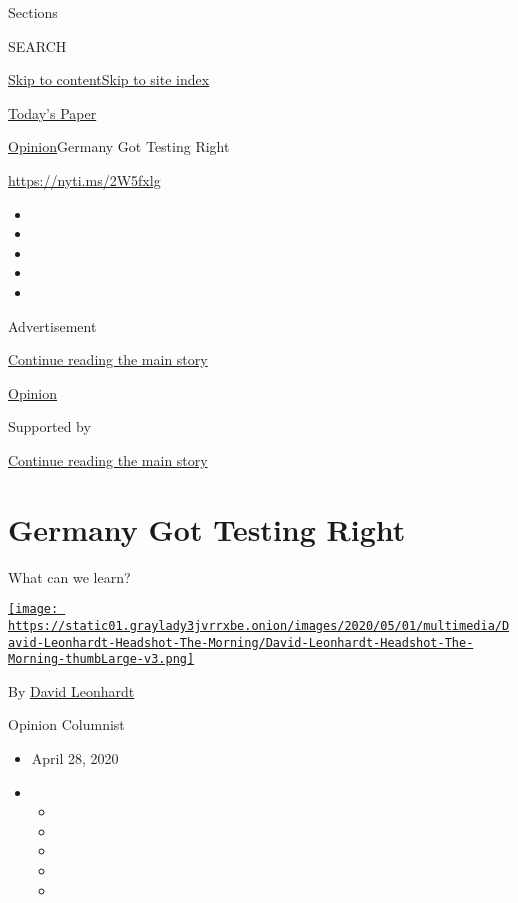 Sections

SEARCH

\protect\hyperlink{site-content}{Skip to
content}\protect\hyperlink{site-index}{Skip to site index}

\href{https://myaccount.nytimes3xbfgragh.onion/auth/login?response_type=cookie\&client_id=vi}{}

\href{https://www.nytimes3xbfgragh.onion/section/todayspaper}{Today's
Paper}

\href{/section/opinion}{Opinion}\textbar{}Germany Got Testing Right

\url{https://nyti.ms/2W5fxlg}

\begin{itemize}
\item
\item
\item
\item
\item
\end{itemize}

Advertisement

\protect\hyperlink{after-top}{Continue reading the main story}

\href{/section/opinion}{Opinion}

Supported by

\protect\hyperlink{after-sponsor}{Continue reading the main story}

\hypertarget{germany-got-testing-right}{%
\section{Germany Got Testing Right}\label{germany-got-testing-right}}

What can we learn?

\href{https://www.nytimes3xbfgragh.onion/by/david-leonhardt}{\texttt{[image: https://static01.graylady3jvrrxbe.onion/images/2020/05/01/multimedia/David-Leonhardt-Headshot-The-Morning/David-Leonhardt-Headshot-The-Morning-thumbLarge-v3.png]}}

By \href{https://www.nytimes3xbfgragh.onion/by/david-leonhardt}{David
Leonhardt}

Opinion Columnist

\begin{itemize}
\item
  April 28, 2020
\item
  \begin{itemize}
  \item
  \item
  \item
  \item
  \item
  \end{itemize}
\end{itemize}


